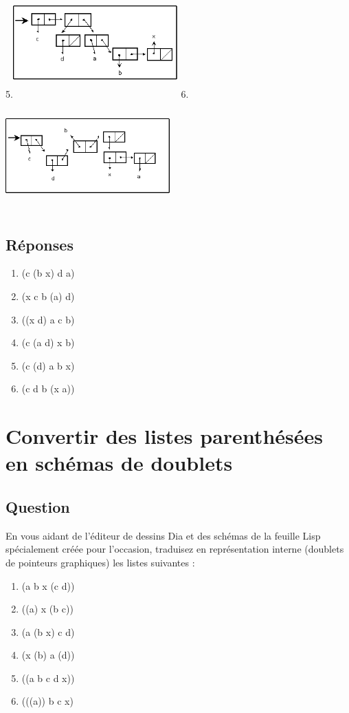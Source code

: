 \documentclass[a4paper, 11pt]{article}
\begin{document}
5.\includegraphics[height=120pt, width=180pt]{Pointeurs_Exo5.png}  6.\includegraphics[height=120pt, width=180pt]{Pointeurs_Exo6.png}\\

\subsection{Réponses}

\begin{enumerate}
    \item (c (b x) d a)
    \item (x c b (a) d)
    \item ((x d) a c b)
    \item (c (a d) x b)
    \item (c (d) a b x)
    \item (c d b (x a))
\end{enumerate}

\section{Convertir des listes parenthésées en schémas de doublets}
\subsection{Question}
En vous aidant de l'éditeur de dessins Dia et des schémas de la feuille Lisp spécialement créée pour l'occasion, traduisez en représentation interne (doublets de pointeurs graphiques) les listes suivantes :
\begin{enumerate}
    \item (a b x (c d))
    \item ((a) x (b c))
    \item (a (b x) c d)
    \item (x (b) a (d))
    \item ((a b c d x))
    \item (((a)) b c x)
\end{enumerate}
\end{document}
